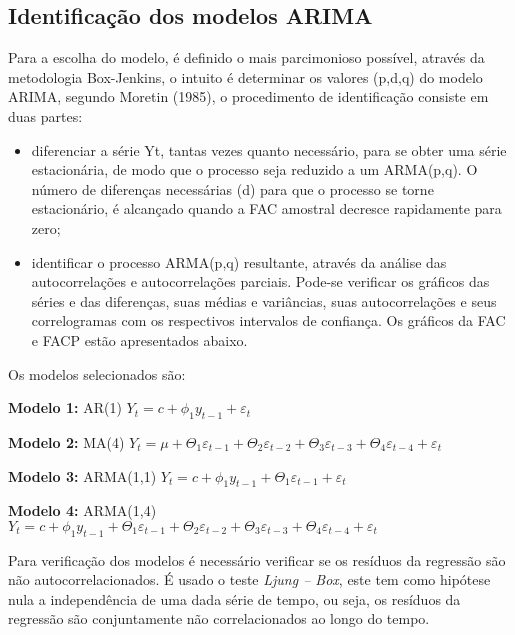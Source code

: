 \documentclass[a4paper,12pt,oneside,titlepage]{article}
\begin{document}
\subsection*{Identificação dos modelos ARIMA}

Para a escolha do modelo, é definido o mais parcimonioso
possível, através da metodologia Box-Jenkins, o intuito é determinar os
valores (p,d,q) do modelo ARIMA, segundo Moretin (1985), o
procedimento de identificação consiste em duas partes:
\begin{itemize}
	\item diferenciar a série Yt, tantas vezes quanto necessário, para se
obter uma série estacionária, de modo que o processo seja
reduzido a um ARMA(p,q). O número de diferenças necessárias
(d) para que o processo se torne estacionário, é alcançado
quando a FAC amostral decresce rapidamente para zero;
\item identificar o processo ARMA(p,q) resultante, através da análise
das autocorrelações e autocorrelações parciais. Pode-se verificar
os gráficos das séries e das diferenças, suas médias e
variâncias, suas autocorrelações e seus correlogramas com os
respectivos intervalos de confiança. Os gráficos da FAC e FACP
estão apresentados abaixo.


\end{itemize}


Os modelos selecionados são: 

\textbf{Modelo 1:} AR(1) $ Y_t= c + \phi_1 y_{t-1} + \varepsilon_t $

\textbf{Modelo 2:} MA(4) $ Y_t= \mu + \varTheta_1 \varepsilon_{t-1} + \varTheta_2 \varepsilon_{t-2} +\varTheta_3 \varepsilon_{t-3} +\varTheta_4 \varepsilon_{t-4} +\varepsilon_t$

\textbf{Modelo 3:} ARMA(1,1)  $ Y_t= c + \phi_1 y_{t-1} + \varTheta_1 \varepsilon_{t-1} + \varepsilon_t$


\textbf{Modelo 4:} ARMA(1,4) $ Y_t= c + \phi_1 y_{t-1} + \varTheta_1 \varepsilon_{t-1} + \varTheta_2 \varepsilon_{t-2} +\varTheta_3 \varepsilon_{t-3} +\varTheta_4 \varepsilon_{t-4} +\varepsilon_t$

Para verificação dos modelos é necessário verificar se os resíduos da regressão são não autocorrelacionados. É usado o teste \textit{Ljung – Box}, este tem como hipótese nula a independência de uma dada série de tempo, ou seja, os resíduos da regressão são conjuntamente não correlacionados ao longo do tempo.
\end{document}
